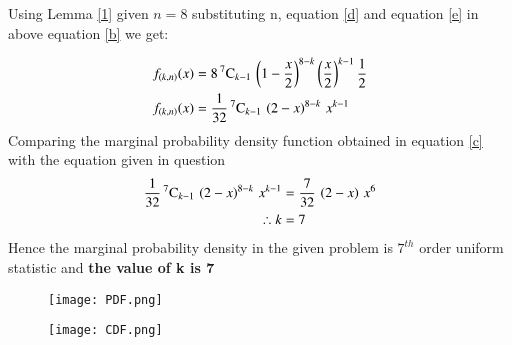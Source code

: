 \documentclass[journal,12pt,twocolumn]{IEEEtran}
\begin{document}
Using Lemma \eqref{1} given $n=8$ substituting n, equation \eqref{d} and equation \eqref{e}  in above equation \eqref{b} we get:

\begin{align}
\nonumber f_{(k,n)}(x) &= 8\,{}^{7}\mathrm{C}_{k-1}\,\left(1-\dfrac{x}{2}\right)^{8-k}\left(\dfrac{x}{2}\right)^{k-1} \dfrac{1}{2} \\
f_{(k,n)}(x) &= \dfrac{1}{32}\,{}^{7}\mathrm{C}_{k-1}\,\left(2-x\right)^{8-k}\,x^{k-1} \label{c} 
\end{align}
Comparing the marginal probability density function obtained in equation \eqref{c} with the equation given in question
\begin{align}
\nonumber \dfrac{1}{32}\,{}^{7}\mathrm{C}_{k-1}\,\left(2-x\right)^{8-k}\,x^{k-1} &= \dfrac{7}{32}\,\left(2-x\right)\,x^6 \\
\therefore k &= 7 
\end{align}
Hence the marginal probability density in the given problem is $7^{th}$ order uniform statistic and \textbf{the value of k is 7}
\newpage
\begin{figure}[htp]
    \centering
    \texttt{[image: PDF.png]}
    \label{fig:PDF  of X}
\end{figure}
\begin{figure}[htp]
    \centering
    \texttt{[image: CDF.png]}
    \label{fig:CDF of X}
\end{figure}
\end{document}
